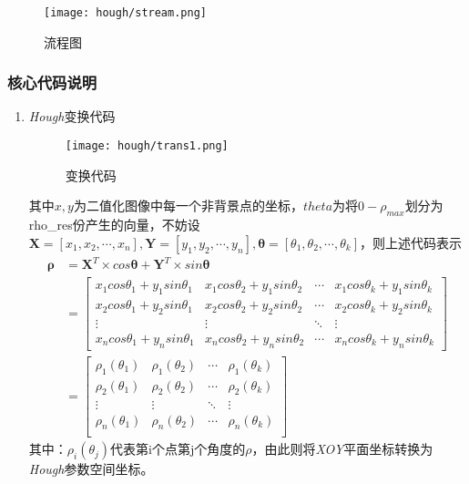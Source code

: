         \begin{figure}[H]
            \centering 
            \texttt{[image: hough/stream.png]}
            \caption{流程图}
            \label{hough_stream}
        \end{figure}

    \subsubsection{核心代码说明}
        \begin{enumerate}
            \item \textit{Hough}变换代码
            
            \begin{figure}[H]
                \centering 
                \texttt{[image: hough/trans1.png]}
                \caption{变换代码}
                \label{hough_transcode}
            \end{figure}

            其中$x,y$为二值化图像中每一个非背景点的坐标，$theta$为将$0-\rho_{max}$划分为rho\_res份产生的向量，不妨设
            $\bm{X}=[x_1,x_2, \cdots, x_n], \bm{Y}=[y_1,y_2, \cdots , y_n],\bm{\theta} = [\theta_1,\theta_2, \cdots ,\theta_k]$，则上述代码表示
            \begin{equation}
                \label{calrho}
                    \begin{aligned}
                        \bm{\rho}&=\bm{X}^T \times cos\bm{\theta} + \bm{Y}^T \times sin\bm{\theta} \\
                                &=\begin{bmatrix} x_1 cos\theta_1+y_1 sin\theta_1 & x_1 cos\theta_2+y_1 sin\theta_2 & \cdots & x_1 cos\theta_k+y_1 sin\theta_k \\  x_2 cos\theta_1+y_2 sin\theta_1 & x_2 cos\theta_2+y_2 sin\theta_2 & \cdots & x_2 cos\theta_k+y_2 sin\theta_k \\ \vdots & \vdots & \ddots &\vdots \\  x_n cos\theta_1+y_n sin\theta_1 & x_n cos\theta_2+y_n sin\theta_2 & \cdots & x_n cos\theta_k+y_n sin\theta_k  \end{bmatrix}\\
                                &=\begin{bmatrix} \rho_1(\theta_1) & \rho_1(\theta_2) & \cdots & \rho_1(\theta_k) \\ \rho_2(\theta_1) & \rho_2(\theta_2) & \cdots & \rho_2(\theta_k) \\ \vdots & \vdots & \ddots &\vdots \\ \rho_n(\theta_1) & \rho_n(\theta_2) & \cdots & \rho_n(\theta_k) \\ \end{bmatrix}
                    \end{aligned}
            \end{equation}
            其中：$\rho_i(\theta_j)$代表第i个点第j个角度的$\rho$，由此则将\textit{XOY}平面坐标转换为\textit{Hough}参数空间坐标。


\end{enumerate}
